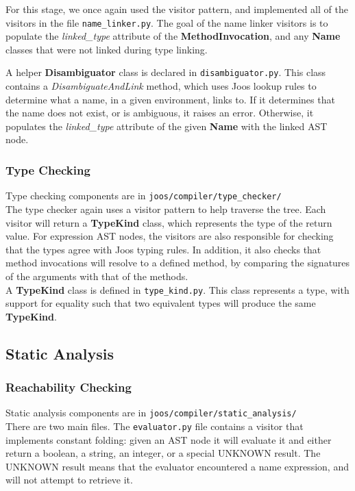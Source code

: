 \documentclass[12pt, a4paper]{article}
\newcommand{\class}{\textbf}
\newcommand{\method}{\textit}
\begin{document}
For this stage, we once again used the visitor pattern, and implemented all of the visitors in the file \verb|name_linker.py|. The goal of the name linker visitors is to populate the \method{linked\_type} attribute of the \class{MethodInvocation}, and any \class{Name} classes that were not linked during type linking.

A helper \class{Disambiguator} class is declared in \verb|disambiguator.py|. This class contains a \method{DisambiguateAndLink} method, which uses Joos lookup rules to determine what a name, in a given environment, links to. If it determines that the name does not exist, or is ambiguous, it raises an error. Otherwise, it populates the \method{linked\_type} attribute of the given \class{Name} with the linked AST node.


\subsubsection{Type Checking}

Type checking components are in \verb|joos/compiler/type_checker/| \\

The type checker again uses a visitor pattern to help traverse the tree. Each visitor will return a \class{TypeKind} class, which represents the type of the return value. For expression AST nodes, the visitors are also responsible for checking that the types agree with Joos typing rules. In addition, it also checks that method invocations will resolve to a defined method, by comparing the signatures of the arguments with that of the methods.\\

A \class{TypeKind} class is defined in \verb|type_kind.py|. This class represents a type, with support for equality such that two equivalent types will produce the same \class{TypeKind}.


\subsection{Static Analysis}

\subsubsection{Reachability Checking}

Static analysis components are in \verb|joos/compiler/static_analysis/| \\

There are two main files. The \verb|evaluator.py| file contains a visitor that implements constant folding: given an AST node it will evaluate it and either return a boolean, a string, an integer, or a special UNKNOWN result. The UNKNOWN result means that the evaluator encountered a name expression, and will not attempt to retrieve it.
\end{document}

